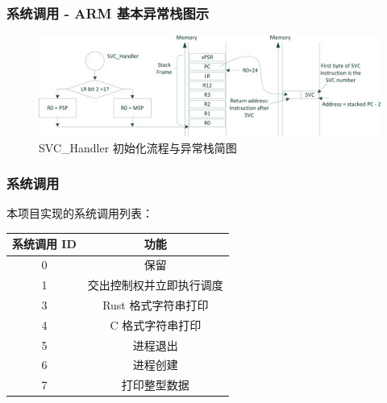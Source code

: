 \documentclass[aspectratio=169]{beamer}
\begin{document}
\begin{frame}

    \frametitle{系统调用 - ARM 基本异常栈图示}

    \begin{figure}
    \centering
        \captionsetup{font=song}
        \includegraphics{3-s2.0-B9780124080829000105-f10-05-9780124080829.jpg}
        \caption{SVC\_Handler 初始化流程与异常栈简图}
    \end{figure}

\end{frame}

\begin{frame}
    \frametitle{系统调用}

    本项目实现的系统调用列表：

    \begin{center}
        \begin{tabular}{ |c|c| }
            \hline
            \textbf{系统调用 ID} & \textbf{功能} \\ \hline
            0 & 保留 \\
            1 & 交出控制权并立即执行调度 \\
            3 & Rust 格式字符串打印 \\ 
            4 & C 格式字符串打印 \\
            5 & 进程退出 \\
            6 & 进程创建 \\
            7 & 打印整型数据 \\ \hline
        \end{tabular}
    \end{center}
    
\end{frame}
\end{document}

